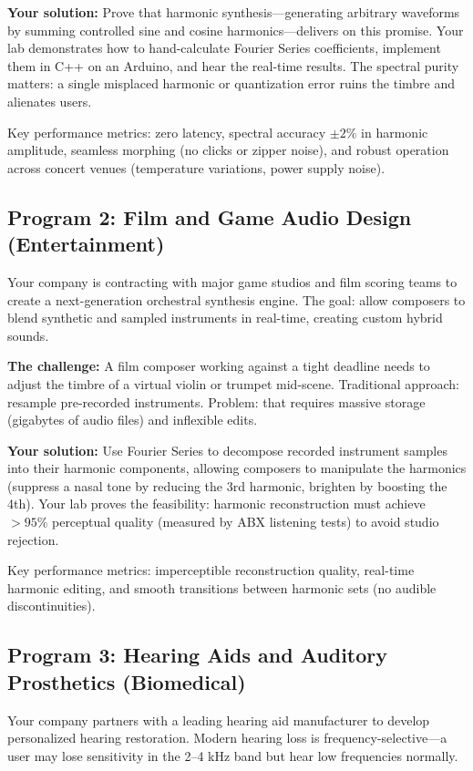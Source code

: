 \documentclass[11pt,letterpaper]{article}
\begin{document}
\textbf{Your solution:} Prove that harmonic synthesis—generating arbitrary waveforms by summing controlled sine and cosine harmonics—delivers on this promise. Your lab demonstrates how to hand-calculate Fourier Series coefficients, implement them in C++ on an Arduino, and hear the real-time results. The spectral purity matters: a single misplaced harmonic or quantization error ruins the timbre and alienates users.

Key performance metrics: zero latency, spectral accuracy $\pm 2\%$ in harmonic amplitude, seamless morphing (no clicks or zipper noise), and robust operation across concert venues (temperature variations, power supply noise).

\subsection{Program 2: Film and Game Audio Design (Entertainment)}

Your company is contracting with major game studios and film scoring teams to create a next-generation orchestral synthesis engine. The goal: allow composers to blend synthetic and sampled instruments in real-time, creating custom hybrid sounds.

\textbf{The challenge:} A film composer working against a tight deadline needs to adjust the timbre of a virtual violin or trumpet mid-scene. Traditional approach: resample pre-recorded instruments. Problem: that requires massive storage (gigabytes of audio files) and inflexible edits.

\textbf{Your solution:} Use Fourier Series to decompose recorded instrument samples into their harmonic components, allowing composers to manipulate the harmonics (suppress a nasal tone by reducing the 3rd harmonic, brighten by boosting the 4th). Your lab proves the feasibility: harmonic reconstruction must achieve $> 95\%$ perceptual quality (measured by ABX listening tests) to avoid studio rejection.

Key performance metrics: imperceptible reconstruction quality, real-time harmonic editing, and smooth transitions between harmonic sets (no audible discontinuities).

\subsection{Program 3: Hearing Aids and Auditory Prosthetics (Biomedical)}

Your company partners with a leading hearing aid manufacturer to develop personalized hearing restoration. Modern hearing loss is frequency-selective—a user may lose sensitivity in the 2–4 kHz band but hear low frequencies normally.
\end{document}
